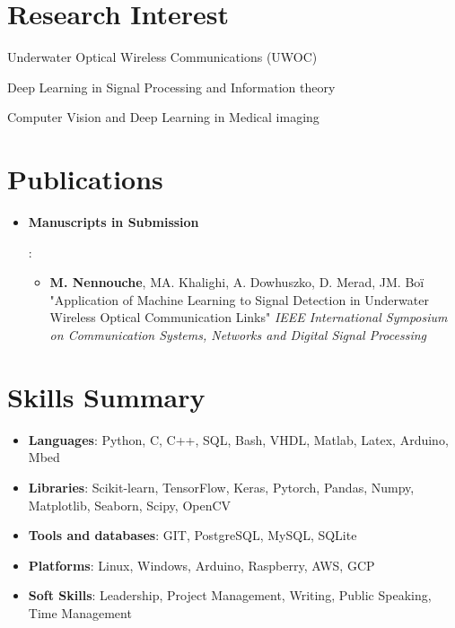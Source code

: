 \documentclass[a4paper,20pt]{article}
\newcommand{\resumeItem}[2]{
  \item\small{
    \textbf{#1}{: #2 \vspace{-2pt}}
  }
}
\newcommand{\resumeSubItem}[2]{\resumeItem{#1}{#2}\vspace{-3pt}}
\newcommand{\resumeSubHeadingListStart}{\begin{itemize}[leftmargin=*]}
\newcommand{\resumeSubHeadingListEnd}{\end{itemize}}
\begin{document}
\vspace{-5pt}
\section{Research Interest}
\begin{description}[font=$\bullet$]
  \item{Underwater Optical Wireless Communications (UWOC)}
  \item{Deep Learning in Signal Processing and Information theory}
  \item{Computer Vision and Deep Learning in Medical imaging}
\end{description}

\vspace{-5pt}
\section{Publications}
  \resumeSubHeadingListStart
  \resumeSubItem{Manuscripts in Submission}{
    \begin{itemize}
      \item \textbf{M. Nennouche}, MA. Khalighi, A. Dowhuszko, D. Merad, JM. Boï "Application of Machine Learning to Signal Detection in Underwater Wireless Optical Communication Links" \textit{IEEE International Symposium on Communication Systems, Networks and Digital Signal Processing}
    \end{itemize}
  }
  \resumeSubHeadingListEnd

\vspace{-5pt}
\section{Skills Summary}
	\resumeSubHeadingListStart
    \resumeSubItem{Languages}{Python, C, C++, SQL, Bash, VHDL, Matlab, Latex, Arduino, Mbed} %
    \resumeSubItem{Libraries}{Scikit-learn, TensorFlow, Keras, Pytorch, Pandas, Numpy, Matplotlib, Seaborn, Scipy, OpenCV} %
    \resumeSubItem{Tools and databases}{GIT, PostgreSQL, MySQL, SQLite} %
    \resumeSubItem{Platforms}{Linux, Windows, Arduino, Raspberry, AWS, GCP}
    \resumeSubItem{Soft Skills}{Leadership, Project Management, Writing, Public Speaking, Time Management}
  \resumeSubHeadingListEnd
\end{document}
